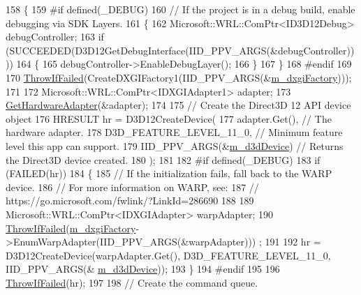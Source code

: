 \begin{DoxyCode}
158 \{
159 \textcolor{preprocessor}{#if defined(\_DEBUG)}
160     \textcolor{comment}{// If the project is in a debug build, enable debugging via SDK Layers.}
161     \{
162         Microsoft::WRL::ComPtr<ID3D12Debug> debugController;
163         \textcolor{keywordflow}{if} (SUCCEEDED(D3D12GetDebugInterface(IID\_PPV\_ARGS(&debugController))))
164         \{
165             debugController->EnableDebugLayer();
166         \}
167     \}
168 \textcolor{preprocessor}{#endif}
169 
170     \mbox{\hyperlink{_direct_x_helper_8h_abca3eeca6b5772a1112e0a9a9e3d9013}{ThrowIfFailed}}(CreateDXGIFactory1(IID\_PPV\_ARGS(&\mbox{\hyperlink{class_d_x_1_1_device_resources_ab644f438ae69bde6c40c147dbda95928}{m\_dxgiFactory}})));
171 
172     Microsoft::WRL::ComPtr<IDXGIAdapter1> adapter;
173     \mbox{\hyperlink{class_d_x_1_1_device_resources_a9d990146724d7f465b277c95675459bd}{GetHardwareAdapter}}(&adapter);
174 
175     \textcolor{comment}{// Create the Direct3D 12 API device object}
176     HRESULT hr = D3D12CreateDevice(
177         adapter.Get(),                  \textcolor{comment}{// The hardware adapter.}
178         D3D\_FEATURE\_LEVEL\_11\_0,         \textcolor{comment}{// Minimum feature level this app can support.}
179         IID\_PPV\_ARGS(&\mbox{\hyperlink{class_d_x_1_1_device_resources_ac883ca593d5c03fe20d5865cb033cee1}{m\_d3dDevice}})       \textcolor{comment}{// Returns the Direct3D device created.}
180     );
181 
182 \textcolor{preprocessor}{#if defined(\_DEBUG)}
183     \textcolor{keywordflow}{if} (FAILED(hr))
184     \{
185         \textcolor{comment}{// If the initialization fails, fall back to the WARP device.}
186         \textcolor{comment}{// For more information on WARP, see: }
187         \textcolor{comment}{// https://go.microsoft.com/fwlink/?LinkId=286690}
188 
189         Microsoft::WRL::ComPtr<IDXGIAdapter> warpAdapter;
190         \mbox{\hyperlink{_direct_x_helper_8h_abca3eeca6b5772a1112e0a9a9e3d9013}{ThrowIfFailed}}(\mbox{\hyperlink{class_d_x_1_1_device_resources_ab644f438ae69bde6c40c147dbda95928}{m\_dxgiFactory}}->EnumWarpAdapter(IID\_PPV\_ARGS(&warpAdapter)))
      ;
191 
192         hr = D3D12CreateDevice(warpAdapter.Get(), D3D\_FEATURE\_LEVEL\_11\_0, IID\_PPV\_ARGS(&
      \mbox{\hyperlink{class_d_x_1_1_device_resources_ac883ca593d5c03fe20d5865cb033cee1}{m\_d3dDevice}}));
193     \}
194 \textcolor{preprocessor}{#endif}
195 
196     \mbox{\hyperlink{_direct_x_helper_8h_abca3eeca6b5772a1112e0a9a9e3d9013}{ThrowIfFailed}}(hr);
197 
198     \textcolor{comment}{// Create the command queue.}

\end{DoxyCode}
